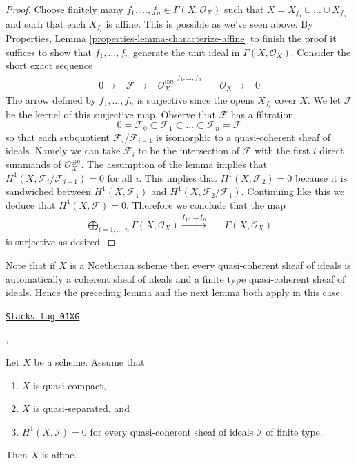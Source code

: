 \begin{proof}
\medskip\noindent
Choose finitely many $f_1, \ldots, f_n \in \Gamma(X, \mathcal{O}_X)$
such that $X = X_{f_1} \cup \ldots \cup X_{f_n}$ and such that each
$X_{f_i}$ is affine. This is possible as we've seen above.
By Properties, Lemma \ref{properties-lemma-characterize-affine}
to finish the proof it suffices
to show that $f_1, \ldots, f_n$ generate the unit ideal in
$\Gamma(X, \mathcal{O}_X)$. Consider the short exact sequence
$$
\begin{array}{cccccc}0 \longrightarrow & \mathcal{F} \longrightarrow & \mathcal{O}_X^{\oplus n} \overset{f_1, \ldots, f_n}{\longrightarrow} &  & \mathcal{O}_X \longrightarrow & 0\end{array}
$$
The arrow defined by $f_1, \ldots, f_n$ is surjective since the
opens $X_{f_i}$ cover $X$. We let $\mathcal{F}$ be the kernel
of this surjective map.
Observe that $\mathcal{F}$ has a filtration
$$
0 = \mathcal{F}_0 \subset \mathcal{F}_1 \subset
\ldots \subset \mathcal{F}_n = \mathcal{F}
$$
so that each subquotient $\mathcal{F}_i/\mathcal{F}_{i - 1}$ is
isomorphic to a quasi-coherent sheaf of ideals.
Namely we can take $\mathcal{F}_i$ to be the intersection of
$\mathcal{F}$ with the first $i$ direct summands of
$\mathcal{O}_X^{\oplus n}$.
The assumption
of the lemma implies that $H^1(X, \mathcal{F}_i/\mathcal{F}_{i - 1}) = 0$
for all $i$. This implies that
$H^1(X, \mathcal{F}_2) = 0$ because it is sandwiched between
$H^1(X, \mathcal{F}_1)$ and $H^1(X, \mathcal{F}_2/\mathcal{F}_1)$.
Continuing like this we deduce that $H^1(X, \mathcal{F}) = 0$.
Therefore we conclude that the map
$$
\begin{array}{ccc}\bigoplus\nolimits_{i = 1, \ldots, n} \Gamma(X, \mathcal{O}_X)
\overset{f_1, \ldots, f_n}{\longrightarrow} &  & \Gamma(X, \mathcal{O}_X)\end{array}
$$
is surjective as desired.
\end{proof}

Note that if $X$ is a Noetherian scheme then every quasi-coherent
sheaf of ideals is automatically a coherent sheaf of ideals and a
finite type quasi-coherent sheaf of ideals. Hence
the preceding lemma and the next lemma both apply in this case.

\begin{lemma}
\label{coherent-lemma-quasi-separated-h1-zero-covering}
\href{https://stacks.math.columbia.edu/tag/01XG}{\texttt{Stacks tag 01XG}}

\begin{reference}
\cite{Serre-criterion}, \cite[II, Theorem 5.2.1]{EGA}
\end{reference}

Let $X$ be a scheme. Assume that
\begin{enumerate}
\item $X$ is quasi-compact,
\item $X$ is quasi-separated, and
\item $H^1(X, \mathcal{I}) = 0$ for every quasi-coherent sheaf
of ideals $\mathcal{I}$ of finite type.
\end{enumerate}
Then $X$ is affine.
\end{lemma}

